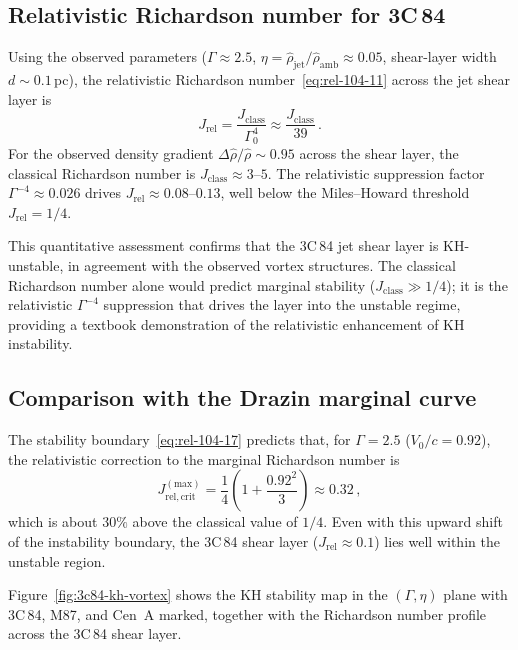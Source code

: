 \subsection{Relativistic Richardson number for 3C\,84}
\label{sec:rel-11-104-3c84-ri}

Using the observed parameters ($\Gamma \approx 2.5$,
$\eta = \hat{\rho}_{\mathrm{jet}}/\hat{\rho}_{\mathrm{amb}} \approx 0.05$,
shear-layer width $d \sim 0.1\,$pc), the relativistic Richardson
number~\eqref{eq:rel-104-11} across the jet shear layer is
\begin{equation}\label{eq:rel-104-3c84-1}
  J_{\mathrm{rel}}
  = \frac{J_{\mathrm{class}}}{\Gamma_{0}^{4}}
  \approx \frac{J_{\mathrm{class}}}{39}\,.
\end{equation}
For the observed density gradient $\Delta\hat{\rho}/\hat{\rho} \sim 0.95$
across the shear layer, the classical Richardson number is
$J_{\mathrm{class}} \approx 3$--$5$.  The relativistic suppression
factor $\Gamma^{-4} \approx 0.026$ drives
$J_{\mathrm{rel}} \approx 0.08$--$0.13$, well below the Miles--Howard
threshold $J_{\mathrm{rel}} = 1/4$.

This quantitative assessment confirms that the 3C\,84 jet shear layer
is KH-unstable, in agreement with the observed vortex structures.
The classical Richardson number alone would predict marginal stability
($J_{\mathrm{class}} \gg 1/4$); it is the relativistic $\Gamma^{-4}$
suppression that drives the layer into the unstable regime, providing
a textbook demonstration of the relativistic enhancement of KH
instability.

\subsection{Comparison with the Drazin marginal curve}
\label{sec:rel-11-104-3c84-drazin}

The stability boundary~\eqref{eq:rel-104-17} predicts that, for
$\Gamma = 2.5$ ($V_{0}/c = 0.92$), the relativistic correction to
the marginal Richardson number is
\begin{equation}
  J_{\mathrm{rel,crit}}^{(\mathrm{max})}
  = \frac{1}{4}\!\left(1 + \frac{0.92^{2}}{3}\right)
  \approx 0.32\,,
\end{equation}
which is about $30\%$ above the classical value of $1/4$.  Even with
this upward shift of the instability boundary, the 3C\,84 shear
layer ($J_{\mathrm{rel}} \approx 0.1$) lies well within the
unstable region.

Figure~\ref{fig:3c84-kh-vortex} shows the KH stability map in the
$(\Gamma, \eta)$ plane with 3C\,84, M87, and Cen~A marked, together
with the Richardson number profile across the 3C\,84 shear layer.

